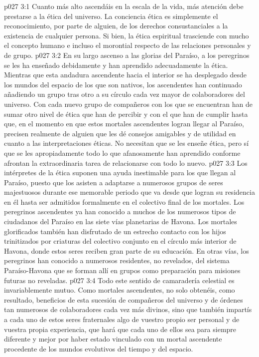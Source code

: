 \vs p027 3:1 Cuanto más alto ascendáis en la escala de la vida, más atención debe prestarse a la ética del universo. La conciencia ética es simplemente el reconocimiento, por parte de alguien, de los derechos consustanciales a la existencia de cualquier persona. Si bien, la ética espiritual trasciende con mucho el concepto humano e incluso el morontial respecto de las relaciones personales y de grupo.
\vs p027 3:2 En su largo ascenso a las glorias del Paraíso, a los peregrinos se les ha enseñado debidamente y han aprendido adecuadamente la ética. Mientras que esta andadura ascendente hacia el interior se ha desplegado desde los mundos del espacio de los que son nativos, los ascendentes han continuado añadiendo un grupo tras otro a su círculo cada vez mayor de colaboradores del universo. Con cada nuevo grupo de compañeros con los que se encuentran han de sumar otro nivel de ética que han de percibir y con el que han de cumplir hasta que, en el momento en que estos mortales ascendentes logran llegar al Paraíso, precisen realmente de alguien que les dé consejos amigables y de utilidad en cuanto a las interpretaciones éticas. No necesitan que se les enseñe ética, pero sí que se les  apropiadamente todo lo que afanosamente han aprendido conforme afrontan la extraordinaria tarea de relacionarse con todo lo nuevo.
\vs p027 3:3 Los intérpretes de la ética suponen una ayuda inestimable para los que llegan al Paraíso, puesto que los asisten a adaptarse a numerosos grupos de seres majestuosos durante ese memorable periodo que va desde que logran su residencia en él hasta ser admitidos formalmente en el colectivo final de los mortales. Los peregrinos ascendentes ya han conocido a muchos de los numerosos tipos de ciudadanos del Paraíso en las siete vías planetarias de Havona. Los mortales glorificados también han disfrutado de un estrecho contacto con los hijos trinitizados por criaturas del colectivo conjunto en el círculo más interior de Havona, donde estos seres reciben gran parte de su educación. En otras vías, los peregrinos han conocido a numerosos residentes, no revelados, del sistema Paraíso\hyp{}Havona que se forman allí en grupos como preparación para misiones futuras no reveladas.
\vs p027 3:4 Todo este sentido de camaradería celestial es invariablemente mutuo. Como mortales ascendentes, no solo obtenéis, como resultado, beneficios de esta sucesión de compañeros del universo y de órdenes tan numerosos de colaboradores cada vez más divinos, sino que también impartís a cada uno de estos seres fraternales algo de vuestro propio ser personal y de vuestra propia experiencia, que hará que cada uno de ellos sea para siempre diferente y mejor por haber estado vinculado con un mortal ascendente procedente de los mundos evolutivos del tiempo y del espacio.

